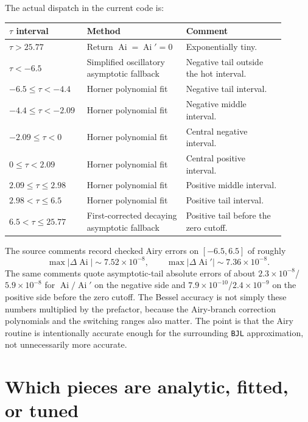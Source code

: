 \documentclass[11pt,a4paper]{article}
\newcommand{\Ai}{\operatorname{Ai}}
\newcommand{\Aip}{\operatorname{Ai}'}
\newcommand{\code}[1]{\texttt{#1}}
\begin{document}
The actual dispatch in the current code is:
\begin{center}
\small
\begin{tabular}{p{0.22\linewidth}p{0.34\linewidth}p{0.34\linewidth}}
\toprule
$\tau$ interval & Method & Comment \\
\midrule
$\tau>25.77$ & Return $\Ai=\Aip=0$ & Exponentially tiny. \\
$\tau<-6.5$ & Simplified oscillatory asymptotic fallback & Negative tail outside the hot interval. \\
$-6.5\le\tau<-4.4$ & Horner polynomial fit & Negative tail interval. \\
$-4.4\le\tau<-2.09$ & Horner polynomial fit & Negative middle interval. \\
$-2.09\le\tau<0$ & Horner polynomial fit & Central negative interval. \\
$0\le\tau<2.09$ & Horner polynomial fit & Central positive interval. \\
$2.09\le\tau\le2.98$ & Horner polynomial fit & Positive middle interval. \\
$2.98<\tau\le6.5$ & Horner polynomial fit & Positive tail interval. \\
$6.5<\tau\le25.77$ & First-corrected decaying asymptotic fallback & Positive tail before the zero cutoff. \\
\bottomrule
\end{tabular}
\end{center}

The source comments record checked Airy errors on $[-6.5,6.5]$ of roughly
\begin{equation}
  \max |\Delta\Ai|\sim7.52\times10^{-8},
  \qquad
  \max |\Delta\Aip|\sim7.36\times10^{-8}.
\end{equation}
The same comments quote asymptotic-tail absolute errors of about
$2.3\times10^{-8}$/$5.9\times10^{-8}$ for $\Ai/\Aip$ on the negative side
and $7.9\times10^{-10}$/$2.4\times10^{-9}$ on the positive side before the
zero cutoff.
The Bessel accuracy is not simply these numbers multiplied by the prefactor, because the Airy-branch correction polynomials and the switching ranges also matter.  The point is that the Airy routine is intentionally accurate enough for the surrounding \code{BJL} approximation, not unnecessarily more accurate.

\section{Which pieces are analytic, fitted, or tuned}
\end{document}
